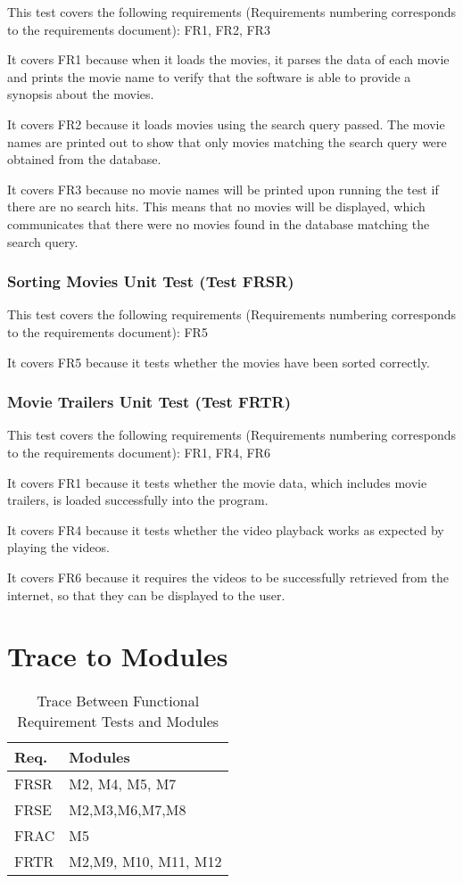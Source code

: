 \documentclass[12pt, titlepage]{article}
\begin{document}
This test covers the following requirements (Requirements numbering corresponds to the requirements document): FR1, FR2, FR3

It covers FR1 because when it loads the movies, it parses the data of each movie and prints the movie name to verify that the software is able to provide a synopsis about the movies. 

It covers FR2 because it loads movies using the search query passed. The movie names are printed out to show that only movies matching the search query were obtained from the database.

It covers FR3 because no movie names will be printed upon running the test if there are no search hits. This means that no movies will be displayed, which communicates that there were no movies found in the database matching the search query. 

\subsubsection{Sorting Movies Unit Test (Test FRSR)}

This test covers the following requirements (Requirements numbering corresponds to the requirements document): FR5

It covers FR5 because it tests whether the movies have been sorted correctly. 

\subsubsection{Movie Trailers Unit Test (Test FRTR)}

This test covers the following requirements (Requirements numbering corresponds to the requirements document): FR1, FR4, FR6
		
It covers FR1 because it tests whether the movie data, which includes movie trailers, is loaded successfully into the program. 

It covers FR4 because it tests whether the video playback works as expected by playing the videos. 

It covers FR6 because it requires the videos to be successfully retrieved from the internet, so that they can be displayed to the user. 
 
\section{Trace to Modules}

\begin{table}[H]
\begin{tabular}{p{} p{}}
\toprule
\textbf{Req.} & \textbf{Modules}\\
\midrule
FRSR & M2, M4, M5, M7\\
FRSE & M2,M3,M6,M7,M8\\
FRAC & M5\\
FRTR & M2,M9, M10, M11, M12\\
\bottomrule
\end{tabular}
\caption{Trace Between Functional Requirement Tests and Modules}
\end{table}
\end{document}
